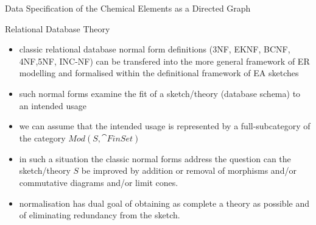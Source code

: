 

\newcommand{\CEsymboltype}[0]{varchar(2)}
\newcommand{\CEatomicnumbertype}{number(1,1000)}
\newcommand{\CEfloattype}{float}
\newcommand{\CEnametype}{varchar(64)}
\newcommand{\CEvalencynumbertype}{number(-7,7)}


\iffalse %
\begin{frame}{Definitions - Johnstone et al.}
\begin{definition}{Johnstone et al}
An \textit{EA sketch} is a sketch $\tuple{G,D,L,C}$ where $G$ is a directed graph, $D$ a set of diagrams in $G$, $L$ a set of finite cones and
$C$ a set of finite discrete cocones.
\end{definition}

If $S$ is an EA-sketch then the theory of $S$ is the lextensive category generated by $S$.

If $S$ is an EA sketch then a model of $S$ is a functor to the category of finite sets preserving finite limits and coproducts.
The category of models is denoted $Mod(S,\cat{FinSet})$.
\end{frame}
\fi

\begin{frame}{Data Specification of the Chemical Elements as a Directed Graph}
\scalebox{0.65}{

} 
\end{frame}

\iffalse %
\begin{frame}{Relational Database Theory}
\begin{itemize}
\item classic relational database normal form definitions ({\scriptsize 3NF, EKNF, BCNF, 4NF,5NF, INC-NF}) can be transfered into the more general framework
of ER modelling and formalised within the definitional framework of EA sketches

\item such normal forms  examine the fit of a sketch/theory (database schema) to an intended usage

\item we can assume that the intended usage is represented by a full-subcategory of the category $Mod(S,\cat{FinSet})$

\item in such a situation the classic normal forms address the question can the sketch/theory $S$ be improved by addition or removal of morphisms and/or commutative diagrams and/or limit cones.
\item normalisation has dual goal of obtaining as complete a theory as possible and of eliminating redundancy from the sketch.  
\end{itemize}
\end{frame}

